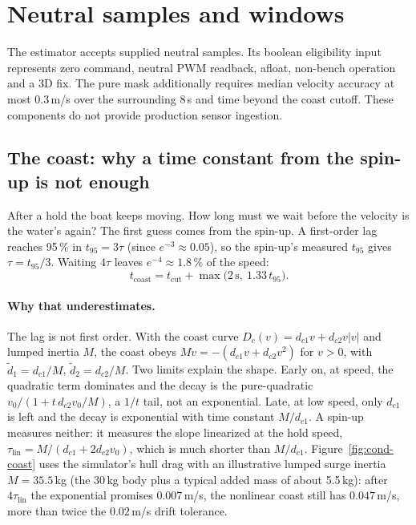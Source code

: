 \section{Neutral samples and windows}
\label{sec:cond-windows}

The estimator accepts supplied neutral samples. Its boolean eligibility input
represents zero command, neutral PWM readback, afloat, non-bench operation and a
3D fix. The pure mask additionally requires median velocity accuracy at most
$0.3$\,m/s over the surrounding 8\,s and time beyond the coast cutoff.
These components do not provide production sensor ingestion.

\subsection{The coast: why a time constant from the spin-up is not enough}
\label{sec:cond-coast}

After a hold the boat keeps moving. How long must we wait before the velocity is
the water's again? The first guess comes from the spin-up. A first-order lag
reaches 95\,\% in $t_{95} = 3\tau$ (since $e^{-3}\approx 0.05$), so the spin-up's
measured $t_{95}$ gives $\tau = t_{95}/3$. Waiting $4\tau$ leaves
$e^{-4}\approx 1.8\,\%$ of the speed:
\[
  t_\text{coast} = t_\text{cut}+\max\big(2\,\text{s},\ 1.33\,t_{95}\big).
\]

\paragraph{Why that underestimates.} The lag is not first order. With the
coast curve $D_c(v) = d_{c1} v + d_{c2} v|v|$ and lumped inertia $M$, the coast obeys
$M\dot v = -(d_{c1} v + d_{c2} v^2)$ for $v>0$, with $\tilde d_1 = d_{c1}/M$, $\tilde d_2 = d_{c2}/M$.
Two limits explain the shape. Early on, at speed, the quadratic term dominates
and the decay is the pure-quadratic $v_0/(1 + t\,d_{c2} v_0/M)$, a $1/t$ tail, not an
exponential. Late, at low speed, only $d_{c1}$ is left and the decay is exponential
with time constant $M/d_{c1}$. A spin-up measures neither: it measures the slope
linearized at the hold speed, $\tau_\text{lin} = M/(d_{c1} + 2d_{c2}v_0)$, which is much
shorter than $M/d_{c1}$. Figure~\ref{fig:cond-coast} uses the simulator's hull drag with an
illustrative lumped surge inertia $M = 35.5$\,kg (the 30\,kg body plus a typical
added mass of about 5.5\,kg): after $4\tau_\text{lin}$ the exponential promises
$0.007$\,m/s, the nonlinear coast still has $0.047$\,m/s, more than twice the
$0.02$\,m/s drift tolerance.

